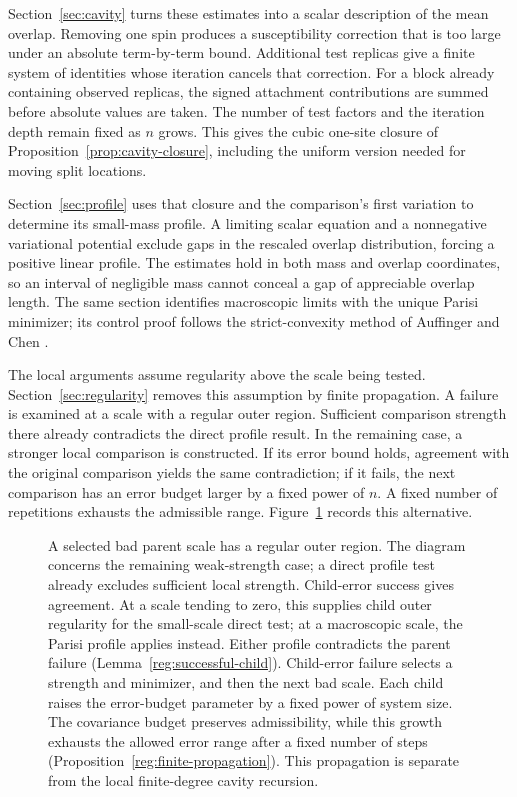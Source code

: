 Section~\ref{sec:cavity} turns these estimates into a scalar description
of the mean overlap. Removing one spin produces a susceptibility
correction that is too large under an absolute term-by-term bound.
Additional test replicas give a finite system of identities whose
iteration cancels that correction. For a block already containing
observed replicas, the signed attachment contributions are summed
before absolute values are taken. The number of test factors and the
iteration depth remain fixed as $n$ grows. This gives the cubic
one-site closure of Proposition~\ref{prop:cavity-closure}, including
the uniform version needed for moving split locations.

Section~\ref{sec:profile} uses that closure and the comparison's first
variation to determine its small-mass profile. A limiting scalar
equation and a nonnegative variational potential exclude gaps in the
rescaled overlap distribution, forcing a positive linear profile.
The estimates hold in both mass and overlap coordinates, so an interval
of negligible mass cannot conceal a gap of appreciable overlap length.
The same section identifies macroscopic limits with the unique Parisi
minimizer; its control proof follows the strict-convexity method of
Auffinger and Chen \cite{AuffingerChenUniqueness2015}.

The local arguments assume regularity above the scale being tested.
Section~\ref{sec:regularity} removes this assumption by finite
propagation. A failure is examined at a scale with a regular outer
region. Sufficient comparison strength there already contradicts the
direct profile result. In the remaining case, a stronger local
comparison is constructed. If its error bound holds, agreement with
the original comparison yields the same contradiction; if it fails,
the next comparison has an error budget larger by a fixed power of $n$.
A fixed number of repetitions exhausts the admissible range.
Figure~\ref{fig:proof-order} records this alternative.

\begin{figure}[htbp]
\centering

\caption{A selected bad parent scale has a regular outer region. The diagram
concerns the remaining weak-strength case; a direct profile test
already excludes sufficient local strength. Child-error success gives
agreement. At a scale tending to zero, this supplies child outer
regularity for the small-scale direct test; at a macroscopic scale,
the Parisi profile applies instead. Either profile contradicts the
parent failure (Lemma~\ref{reg:successful-child}). Child-error failure
selects a strength and minimizer, and then the next bad scale. Each
child raises the error-budget parameter by a fixed power of system
size. The covariance budget preserves admissibility, while this growth
exhausts the allowed error range after a fixed number of steps
(Proposition~\ref{reg:finite-propagation}). This propagation is separate
from the local finite-degree cavity recursion.}
\label{fig:proof-order}
\end{figure}

